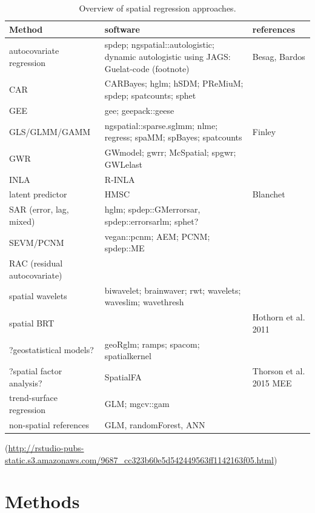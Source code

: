 \documentclass[11pt]{article}
\begin{document}
\begin{table}
\caption{Overview of spatial regression approaches.} \label{tab:approaches}
\hspace{-1cm}
\begin{tabular}{lp{8cm}p{4cm}}\hline
Method  &  software & references \\\hline
autocovariate regression  & spdep; ngspatial::autologistic; dynamic autologistic using JAGS: Guelat-code (footnote)  & Besag, Bardos\\ %
CAR & CARBayes; hglm; hSDM; PReMiuM; spdep; spatcounts; sphet &\\			%
GEE & gee; geepack::geese & \\ 						 			%
GLS/GLMM/GAMM & ngspatial::sparse.sglmm; nlme; regress; spaMM; spBayes; spatcounts & Finley \\ %
GWR & GWmodel; gwrr; McSpatial; spgwr; GWLelast &\\  			%
INLA & R-INLA &\\ 									 			%
latent predictor & HMSC & Blanchet\\ 				 			%
SAR (error, lag, mixed) & hglm; spdep::GMerrorsar, spdep::errorsarlm; sphet? &\\ %
SEVM/PCNM & vegan::pcnm; AEM; PCNM; spdep::ME & \\ %
RAC (residual autocovariate) & & \citet{Crase2013}\\ 			%
spatial wavelets  & biwavelet; brainwaver; rwt; wavelets; waveslim; wavethresh & \citet{Carl2007,Carl2008}\\ %
spatial BRT & & Hothorn et al. 2011 \\ 							%
?geostatistical models? & geoRglm; ramps; spacom; spatialkernel &\\ %
?spatial factor analysis? & SpatialFA & Thorson et al. 2015 MEE\\   %
trend-surface regression & GLM; mgcv::gam & \\\hline 			%
non-spatial references & GLM, randomForest, ANN &\\
\hline
\end{tabular}
(\url{http://rstudio-pubs-static.s3.amazonaws.com/9687_cc323b60e5d542449563ff1142163f05.html})
\end{table}


\section{Methods}
\end{document}
